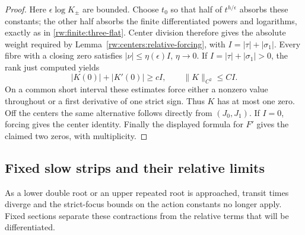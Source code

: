 \begin{proof}
Here $\epsilon\log K_\pm$ are bounded. Choose $t_0$ so that half
of $t^{h/\epsilon}$ absorbs these constants; the other half absorbs
the finite differentiated powers and logarithms, exactly as in
\eqref{rw:finite:three-flat}. Center division therefore gives the
absolute weight required by Lemma~\ref{rw:centers:relative-forcing},
with $I=|\tau|+|\sigma_1|$. Every fibre with a closing zero satisfies
$|\nu|\le\eta(\epsilon)I$, $\eta\to0$.
If $I=|\tau|+|\sigma_1|>0$, the rank just computed yields
\[
 |K(0)|+|K'(0)|\ge cI,\qquad \|K\|_{C^2}\le CI.
\]
On a common short interval these estimates force either a nonzero
value throughout or a first derivative of one strict sign. Thus $K$
has at most one zero.
Off the centers the same alternative follows directly from $(J_0,J_1)$.
If $I=0$, forcing gives the center identity. Finally the displayed
formula for $F'$ gives the claimed two zeros, with multiplicity.
\end{proof}

\subsection{Fixed slow strips and their relative limits}

As a lower double root or an upper repeated root is approached, transit
times diverge and the strict-focus bounds on the action constants no
longer apply. Fixed sections separate these contractions from the
relative terms that will be differentiated.

